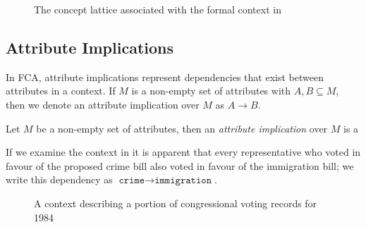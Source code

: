 \begin{figure}[H]
  \caption{The concept lattice associated with the formal context in }
\end{figure}

\subsection{Attribute Implications}
\label{subsection:attribute-implications}

In FCA, attribute implications represent dependencies that exist between attributes in a context. If $M$ is a non-empty set of attributes with $A, B \subseteq M$, then we denote an attribute implication over $M$ as $A \rightarrow B$.

\begin{definition}
     \label{definition:attribute-implication}
     Let $M$ be a non-empty set of attributes, then an \emph{attribute implication} over $M$ is a
\end{definition}


If we examine the context in  it is apparent that every representative who voted in favour of the proposed crime bill also voted in favour of the immigration bill; we write this dependency as $\texttt{crime} \rightarrow \texttt{immigration}$.



\begin{figure}[H]
\centering
    \begin{cxt}
    \end{cxt}
    \caption{A context describing a portion of congressional voting records for 1984}
    \label{context:voting-records-small}
\end{figure}

